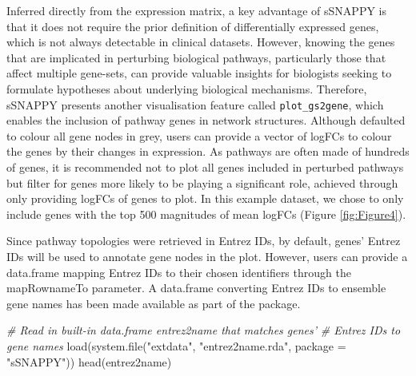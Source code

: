 \documentclass[9pt,a4paper,]{extarticle}
\newenvironment{Shaded}{\begin{snugshade}}{\end{snugshade}}
\newcommand{\AttributeTok}[1]{\textcolor[rgb]{0.77,0.63,0.00}{#1}}
\newcommand{\CommentTok}[1]{\textcolor[rgb]{0.56,0.35,0.01}{\textit{#1}}}
\newcommand{\DecValTok}[1]{\textcolor[rgb]{0.00,0.00,0.81}{#1}}
\newcommand{\FunctionTok}[1]{\textcolor[rgb]{0.00,0.00,0.00}{#1}}
\newcommand{\NormalTok}[1]{#1}
\newcommand{\OtherTok}[1]{\textcolor[rgb]{0.56,0.35,0.01}{#1}}
\newcommand{\SpecialCharTok}[1]{\textcolor[rgb]{0.00,0.00,0.00}{#1}}
\newcommand{\StringTok}[1]{\textcolor[rgb]{0.31,0.60,0.02}{#1}}
\begin{document}
Inferred directly from the expression matrix, a key advantage of sSNAPPY is that it does not require the prior definition of differentially expressed genes, which is not always detectable in clinical datasets. However, knowing the genes that are implicated in perturbing biological pathways, particularly those that affect multiple gene-sets, can provide valuable insights for biologists seeking to formulate hypotheses about underlying biological mechanisms. Therefore, sSNAPPY presents another visualisation feature called \texttt{plot\_gs2gene}, which enables the inclusion of pathway genes in network structures. Although defaulted to colour all gene nodes in grey, users can provide a vector of logFCs to colour the genes by their changes in expression. As pathways are often made of hundreds of genes, it is recommended not to plot all genes included in perturbed pathways but filter for genes more likely to be playing a significant role, achieved through only providing logFCs of genes to plot. In this example dataset, we chose to only include genes with the top 500 magnitudes of mean logFCs (Figure \ref{fig:Figure4}).

\begin{Shaded}
\end{Shaded}

Since pathway topologies were retrieved in Entrez IDs, by default, genes' Entrez IDs will be used to annotate gene nodes in the plot. However, users can provide a data.frame mapping Entrez IDs to their chosen identifiers through the mapRownameTo parameter. A data.frame converting Entrez IDs to ensemble gene names has been made available as part of the package.

\begin{Shaded}
\begin{Highlighting}[]
\CommentTok{\# Read in built{-}in data.frame entrez2name that matches genes’ }
\CommentTok{\# Entrez IDs to gene names}
\FunctionTok{load}\NormalTok{(}\FunctionTok{system.file}\NormalTok{(}\StringTok{"extdata"}\NormalTok{, }\StringTok{"entrez2name.rda"}\NormalTok{, }\AttributeTok{package =} \StringTok{"sSNAPPY"}\NormalTok{))}
\FunctionTok{head}\NormalTok{(entrez2name)}
\end{Highlighting}
\end{Shaded}
\end{document}
